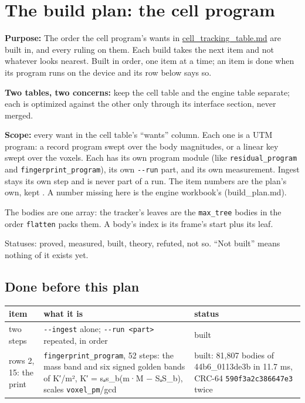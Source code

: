 \chapter{\texorpdfstring{The build plan: the cell program}{The build plan: the cell program}}
\label{chap:build-plan}

\textbf{Purpose:} The order the cell program's wants in \hyperref[chap:cell-tracking-table]{cell\_\allowbreak{}tracking\_\allowbreak{}table.md} are built in, and every ruling on them. Each build takes the next item and not whatever looks nearest. Built in order, one item at a time; an item is done when its program runs on the device and its row below says so.

\textbf{Two tables, two concerns:} keep the cell table and the engine table separate; each is optimized against the other only through its interface section, never merged.

\textbf{Scope:} every want in the cell table's “wants” column. Each one is a UTM program: a record program swept over the body magnitudes, or a linear key swept over the voxels. Each has its own program module (like \texttt{residual\_\allowbreak{}program} and \texttt{fingerprint\_\allowbreak{}program}), its own \texttt{-\allowbreak{}-\allowbreak{}run} part, and its own measurement. Ingest stays its own step and is never part of a run. The item numbers are the plan's own, kept . A number missing here is the engine workbook's (build\_\allowbreak{}plan.md).

The bodies are one array: the tracker's leaves are the \texttt{max\_\allowbreak{}tree} bodies in the order \texttt{flatten} packs them. A body's index is its frame's start plus its leaf.

Statuses: proved, measured, built, theory, refuted, not so. “Not built” means nothing of it exists yet.

\section{\texorpdfstring{Done before this plan}{Done before this plan}}

{\small
\setlength{\tabcolsep}{6pt}
\begin{longtable}{>{\RaggedRight\arraybackslash}p{}>{\RaggedRight\arraybackslash}p{}>{\RaggedRight\arraybackslash}p{}}
\toprule
item & what it is & status \\
\midrule
\endhead
two steps & \texttt{-\allowbreak{}-\allowbreak{}ingest} alone; \texttt{-\allowbreak{}-\allowbreak{}run <part>} repeated, in order & built \\
rows 2, 15: the print & \texttt{fingerprint\_\allowbreak{}program}, 52 steps: the mass band and six signed golden bands of K′/m², K′ = sₐs\_\allowbreak{}b(m·M − SₐS\_\allowbreak{}b), scales \texttt{voxel\_\allowbreak{}pm}/gcd & built: 81,807 bodies of 44b6\_\allowbreak{}0113de3b in 11.7 ms, CRC-64 \texttt{590f3a2c386647e3} twice \\
\bottomrule
\end{longtable}
}

